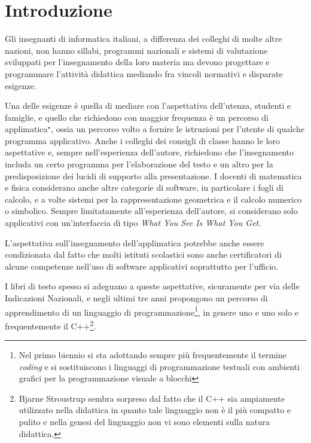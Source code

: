\documentclass[a4paper]{easychair}
\begin{document}
\setcounter{tocdepth}{2}
{\small
\tableofcontents}

\section{Introduzione}
\label{sect:introduction}

Gli insegnanti di informatica italiani, a differenza dei colleghi di molte
altre nazioni, non hanno sillabi, programmi nazionali e sistemi di valutazione
sviluppati per l'insegnamento della loro materia ma devono
progettare e programmare l'attività didattica mediando fra vincoli normativi e
disparate esigenze.

Una delle esigenze è quella di mediare con l'aspettativa dell'utenza, studenti e famiglie,
e quello che richiedono con maggior frequenza è un percorso di applimatica$\phantom{}^\star$,
ossia un percorso volto a fornire le istruzioni per l'utente di qualche programma applicativo.
Anche i colleghi dei consigli di classe hanno le loro aspettative e,
sempre nell'esperienza dell'autore, richiedono che l'insegnamento includa un certo programma
per l'elaborazione del testo e un altro per la predisposizione dei lucidi di supporto alla presentazione.
I docenti di matematica e fisica considerano anche altre categorie di software, in particolare
i fogli di calcolo, e a volte sistemi per la rappresentazione geometrica e il calcolo numerico o simbolico.
Sempre limitatamente all'esperienza dell'autore, si considerano solo applicativi con un'interfaccia di tipo
\textit{What You See Is What You Get}.

L'aspettativa sull'insegnamento dell'applimatica potrebbe anche essere condizionata dal fatto che molti
istituti scolastici sono anche certificatori di alcune competenze nell'uso di software applicativi
soprattutto per l'ufficio.

I libri di testo spesso si adeguano a queste aspettative, sicuramente per via delle Indicazioni Nazionali,
e negli ultimi tre anni propongono un percorso di apprendimento di un linguaggio di programmazione\footnote{%
Nel primo biennio si sta adottando sempre più frequentemente il termine \textit{coding} e si sostituiscono i linguaggi di programmazione testuali con ambienti grafici per la programmazione visuale a blocchi},
in genere uno e uno solo e frequentemente il C++\footnote{Bjarne Stroustrup sembra sorpreso dal fatto che il C++ sia ampiamente utilizzato nella didattica in quanto tale linguaggio non è il più compatto e pulito e nella genesi del linguaggio non vi sono elementi sulla natura didattica.%
}.
\end{document}
